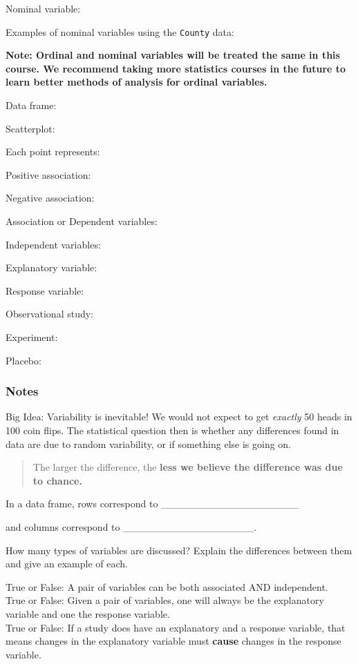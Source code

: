 \documentclass[
]{report}
\newcommand{\rgs}{\vspace{12pt}} %
\newcommand{\rgi}{\hspace{24pt}}  %
\begin{document}
\rgi Nominal variable:
\rgs

\rgi \rgi Examples of nominal variables using the \texttt{County} data:

\rgs

\textbf{Note: Ordinal and nominal variables will be treated the same in this course. We recommend taking more statistics courses in the future to learn better methods of analysis for ordinal variables.}

Data frame:
\rgs

Scatterplot:
\rgs

\rgi Each point represents:

\rgi Positive association:

\rgi Negative association:

Association or Dependent variables:
\rgs

Independent variables:
\rgs

Explanatory variable:
\rgs

Response variable:
\rgs

Observational study:
\rgs

Experiment:
\rgs

Placebo:
\rgs

\hypertarget{notes}{%
\subsubsection*{Notes}\label{notes}}

Big Idea: Variability is inevitable! We would not expect to get \emph{exactly} 50 heads in 100 coin flips. The statistical question then is whether any differences found in data are due to random variability, or if something else is going on.

\begin{quote}
The larger the difference, the \textbf{less we believe the difference was due to chance.}
\end{quote}

In a data frame, rows correspond to \_\_\_\_\_\_\_\_\_\_\_\_\_\_\_\_\_\_\_

and columns correspond to \_\_\_\_\_\_\_\_\_\_\_\_\_\_\_\_\_\_.

How many types of variables are discussed? Explain the differences between them and give an example of each.
\rgs
\rgs

True or False: A pair of variables can be both associated AND independent.\\
True or False: Given a pair of variables, one will always be the explanatory variable and one the response variable.\\
True or False: If a study does have an explanatory and a response variable, that means changes in the explanatory variable must \textbf{cause} changes in the response variable.
\end{document}
